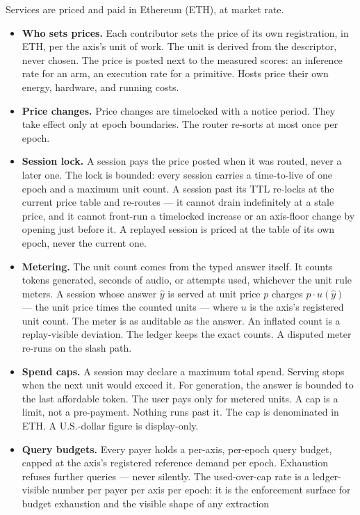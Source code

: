 \documentclass[11pt]{article}
\begin{document}
Services are priced and paid in Ethereum (ETH), at market rate.
\begin{itemize}
\item \textbf{Who sets prices.} Each contributor sets the price
of its own registration, in ETH, per the axis's unit of work. The
unit is derived from the descriptor, never chosen. The price is
posted next to the measured scores: an inference rate for an arm,
an execution rate for a primitive. Hosts price their own energy,
hardware, and running costs.
\item \textbf{Price changes.} Price changes are timelocked with a
notice period. They take effect only at epoch boundaries. The
router re-sorts at most once per epoch.
\item \textbf{Session lock.} A session pays the price posted when
it was routed, never a later one. The lock is bounded: every
session carries a time-to-live of one epoch and a maximum unit
count. A session past its TTL re-locks at the current price table
and re-routes --- it cannot drain indefinitely at a stale price,
and it cannot front-run a timelocked increase or an axis-floor
change by opening just before it. A replayed session is priced at
the table of its own epoch, never the current one.
\item \textbf{Metering.} The unit count comes from the typed
answer itself. It counts tokens generated, seconds of audio, or
attempts used, whichever the unit rule meters. A session whose
answer $\hat y$ is served at unit price $p$ charges
$p \cdot u(\hat y)$ --- the unit price times the counted units
--- where $u$ is the axis's registered unit count. The meter is
as auditable as the answer. An inflated count is a replay-visible
deviation. The ledger keeps the exact counts. A disputed meter
re-runs on the slash path.
\item \textbf{Spend caps.} A session may declare a maximum total
spend. Serving stops when the next unit would exceed it. For
generation, the answer is bounded to the last affordable token.
The user pays only for metered units. A cap is a limit, not a
pre-payment. Nothing runs past it. The cap is denominated in ETH.
A U.S.-dollar figure is display-only.
\item \textbf{Query budgets.} Every payer holds a per-axis,
per-epoch query budget, capped at the axis's registered reference
demand per epoch. Exhaustion refuses further queries --- never
silently. The used-over-cap rate is a ledger-visible number per
payer per axis per epoch: it is the enforcement surface for
budget exhaustion and the visible shape of any extraction

\end{itemize}
\end{document}
